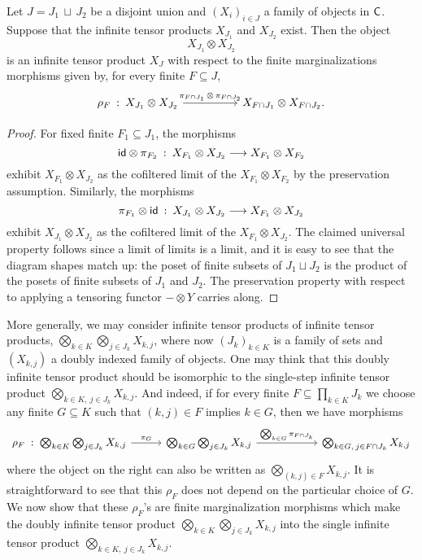 \documentclass[11pt]{article}
\begin{document}
\begin{lemma}
	\label{two_infproducts}
	Let $J = J_1 \,\sqcup\, J_2$ be a disjoint union and $(X_i)_{i \in J}$ a family of objects in $\mathsf{C}$. Suppose that the infinite tensor products $X_{J_1}$ and $X_{J_2}$ exist. Then the object
	\[
		X_{J_1} \otimes X_{J_2} 
	\]
	is an infinite tensor product $X_J$ with respect to the finite marginalizations morphisms given by, for every finite $F \subseteq J$,
	\[
		\begin{tikzcd}[column sep=huge]
			\rho_F \: : \: X_{J_1} \otimes X_{J_2} \ar{r}{\pi_{F\cap J_1} \,\otimes\, \pi_{F\cap J_2}} & X_{F \cap J_1} \otimes X_{F \cap J_2}.
		\end{tikzcd}
	\]
\end{lemma}
\begin{proof}
	For fixed finite $F_1 \subseteq J_1$, the morphisms
	\[
		\mathsf{id} \otimes \pi_{F_2} \: : \: X_{F_1} \otimes X_{J_2} \longrightarrow X_{F_1} \otimes X_{F_2}
	\]
	exhibit $X_{F_1} \otimes X_{J_2}$ as the cofiltered limit of the $X_{F_1} \otimes X_{F_2}$ by the preservation assumption. Similarly, the morphisms
	\[
		\pi_{F_1} \otimes \mathsf{id} \: : \: X_{J_1} \otimes X_{J_2} \longrightarrow X_{F_1} \otimes X_{J_2}
	\]
	exhibit $X_{J_1} \otimes X_{J_2}$ as the cofiltered limit of the $X_{F_1} \otimes X_{J_2}$. The claimed universal property follows since a limit of limits is a limit, and it is easy to see that the diagram shapes match up: the poset of finite subsets of $J_1 \sqcup J_2$ is the product of the posets of finite subsets of $J_1$ and $J_2$. The preservation property with respect to applying a tensoring functor $- \otimes Y$ carries along.
\end{proof}

More generally, we may consider infinite tensor products of infinite tensor products, $\bigotimes_{k \in K} \bigotimes_{j \in J_k} X_{k,j}$, where now $(J_k)_{k \in K}$ is a family of sets and $(X_{k,j})$ a doubly indexed family of objects. One may think that this doubly infinite tensor product should be isomorphic to the single-step infinite tensor product $\bigotimes_{k \in K, \: j \in J_k} X_{k,j}$. And indeed, if for every finite $F \subseteq \prod_{k \in K} J_k$ we choose any finite $G \subseteq K$ such that $(k,j) \in F$ implies $k \in G$, then we have morphisms
\begin{equation}
	\label{double_infproduct}
	\begin{tikzcd}[column sep=1cm]
		\rho_F \; : \; \bigotimes_{k \in K} \bigotimes_{j \in J_k} X_{k,j} \ar{r}{\pi_G} & \bigotimes_{k \in G} \bigotimes_{j \in J_k} X_{k,j} \ar{rr}{\bigotimes_{k \in G} \pi_{F \cap J_k}} & & \bigotimes_{k \in G, \: j \in F \cap J_k} X_{k,j}
	\end{tikzcd}
\end{equation}
where the object on the right can also be written as $\bigotimes_{(k,j) \in F} X_{k,j}$. It is straightforward to see that this $\rho_F$ does not depend on the particular choice of $G$. We now show that these $\rho_F$'s are finite marginalization morphisms which make the doubly infinite tensor product $\bigotimes_{k \in K} \bigotimes_{j \in J_k} X_{k,j}$ into the single infinite tensor product $\bigotimes_{k \in K, \: j \in J_k} X_{k,j}$.
\end{document}

